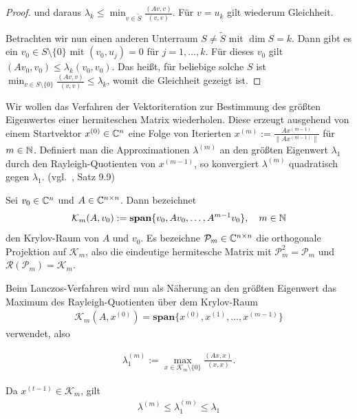 \documentclass{article}
\begin{document}
\begin{theorem}
\begin{proof}
	und daraus $\lambda_k \leq \min_{v \in \tilde{S}} \frac{(Av,v)}{(v,v)}$. Für $v = u_k$ gilt wiederum Gleichheit.

	Betrachten wir nun einen anderen Unterraum $S \neq \tilde{S}$ mit $\dim S = k$. Dann gibt es ein $v_0 \in S \setminus \{0\}$ mit $(v_0,u_j) = 0$ für $j=1,\dots,k$. Für dieses $v_0$ gilt $(Av_0,v_0) \leq \lambda_k (v_0,v_0)$. Das heißt, für beliebige solche $S$ ist $\min_{v \in S \setminus \{0\}} \frac{(Av,v)}{(v,v)} \leq \lambda_k$, womit die Gleichheit gezeigt ist.
\end{proof}

Wir wollen das Verfahren der Vektoriteration zur Bestimmung des größten Eigenwertes einer hermiteschen Matrix wiederholen. Diese erzeugt ausgehend von einem Startvektor $x^{(0)} \in \mathbb{C}^{n}$ eine Folge von Iterierten $x^{(m)} := \frac{Ax^{(m-1)}}{\|Ax^{(m-1)}\|}$ für $m \in \mathbb{N}$. Definiert man die Approximationen $\lambda^{(m)}$ an den größten Eigenwert $\lambda_1$ durch den Rayleigh-Quotienten von $x^{(m-1)}$, so konvergiert $\lambda^{(m)}$ quadratisch gegen $\lambda_1$. (vgl.\ \cite{Num}, Satz 9.9)

\begin{definition}
	Sei $v_0 \in \mathbb{C}^{n}$ und $A \in \mathbb{C}^{n \times n}$. Dann bezeichnet
	\begin{align*}
		\mathcal{K}_m(A,v_0) := \textbf{span}\{v_0, Av_0, \dots, A^{m-1}v_0\}, \quad m \in \mathbb{N}
	\end{align*}
	den Krylov-Raum von $A$ und $v_0$. Es bezeichne $\mathcal{P}_m \in \mathbb{C}^{n \times n}$ die orthogonale Projektion auf $\mathcal{K}_m$, also die eindeutige hermitesche Matrix mit $\mathcal{P}_m^2 = \mathcal{P}_m$ und $\mathcal{R}(\mathcal{P}_m) = \mathcal{K}_m$.
\end{definition}

Beim Lanczos-Verfahren wird nun als Näherung an den größten Eigenwert das Maximum des Rayleigh-Quotienten über dem Krylov-Raum
\begin{align*}
	\mathcal{K}_m(A,x^{(0)}) = \textbf{span}\{x^{(0)}, x^{(1)}, \dots , x^{(m-1)} \}
\end{align*}
verwendet, also

\begin{align*}
	\lambda_1^{(m)} := \max_{x \in \mathcal{K}_m \setminus \{0\}} \frac{(Ax,x)}{(x,x)}.
\end{align*}

Da $x^{(t-1)} \in \mathcal{K}_m$, gilt
\begin{align*}
	\lambda^{(m)} \leq \lambda_1^{(m)} \leq \lambda_1
\end{align*}


\end{theorem}
\end{document}
